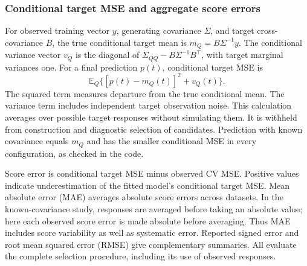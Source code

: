 \documentclass[11pt,a4paper]{article}
\newcommand{\E}{\mathbb{E}}
\begin{document}
\begin{table}[!htbp]
\centering\scriptsize
\setlength{\tabcolsep}{4pt}
\caption{Retained variogram fits compared with the profile covariance search. Top: MAE of selected CV scores relative to conditional target MSE, paired difference for selection by $|J_2|$ minus $W$ with MCSE and Monte Carlo interval, percentage reduction, and the paired difference in the strongest setting and averaged over the other 23. Middle: sign agreement for evaluations with $|O|>0.01$ and mean absolute error of the proxy $VJ_2$, both with estimated isotropic covariance. Bottom: fits changed by any amount and fits whose correlation scale changed by more than 1\%. Generated by \texttt{make\_profile\_refit\_table.R} in \texttt{revision/exploratory}.}
\label{tab:profile-refit}

\end{table}

\subsubsection{Conditional target MSE and aggregate score errors}
\label{sec:refitting-scores}
For observed training vector $y$, generating covariance $\Sigma$, and target cross-covariance $B$, the true conditional target mean is $m_Q=B\Sigma^{-1}y$. The conditional variance vector $v_Q$ is the diagonal of $\Sigma_{QQ}-B\Sigma^{-1}B^\top$, with target marginal variances one. For a final prediction $p(t)$, conditional target MSE is
\[
 \E_Q\{[p(t)-m_Q(t)]^2+v_Q(t)\}.
\]
The squared term measures departure from the true conditional mean. The variance term includes independent target observation noise. This calculation averages over possible target responses without simulating them. It is withheld from construction and diagnostic selection of candidates. Prediction with known covariance equals $m_Q$ and has the smaller conditional MSE in every configuration, as checked in the code.

Score error is conditional target MSE minus observed CV MSE. Positive values indicate underestimation of the fitted model's conditional target MSE. Mean absolute error (MAE) averages absolute score errors across datasets. In the known-covariance study, responses are averaged before taking an absolute value; here each observed score error is made absolute before averaging. Thus MAE includes score variability as well as systematic error. Reported signed error and root mean squared error (RMSE) give complementary summaries. All evaluate the complete selection procedure, including its use of observed responses.
\end{document}
